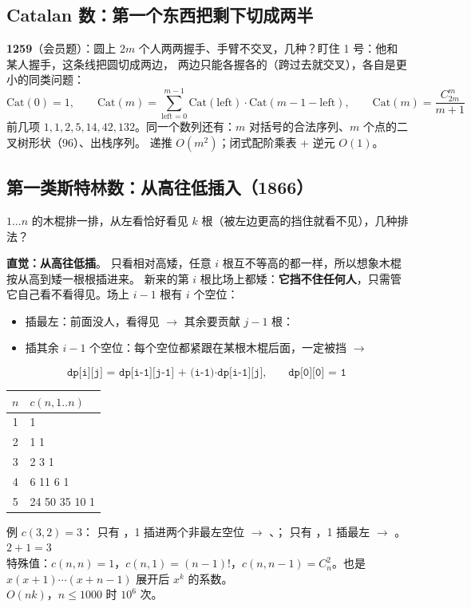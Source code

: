 \subsection{Catalan 数：第一个东西把剩下切成两半}

\textbf{1259}（会员题）：圆上 $2m$ 个人两两握手、手臂不交叉，几种？盯住 1 号：他和某人握手，这条线把圆切成两边，
两边只能各握各的（跨过去就交叉），各自是更小的同类问题：
\[
\text{Cat}(0) = 1,\qquad \text{Cat}(m) = \sum_{\text{left}=0}^{m-1} \text{Cat}(\text{left}) \cdot \text{Cat}(m-1-\text{left}),\qquad \text{Cat}(m) = \frac{C_{2m}^{m}}{m+1}
\]
前几项 $1, 1, 2, 5, 14, 42, 132$。同一个数列还有：$m$ 对括号的合法序列、$m$ 个点的二叉树形状（96）、出栈序列。
递推 $O(m^2)$；闭式配阶乘表 + 逆元 $O(1)$。

\subsection{第一类斯特林数：从高往低插入（1866）}

$1 \dots n$ 的木棍排一排，从左看恰好看见 $k$ 根（被左边更高的挡住就看不见），几种排法？

\textbf{直觉：从高往低插}。 只看相对高矮，任意 $i$ 根互不等高的都一样，所以想象木棍按从高到矮一根根插进来。
新来的第 $i$ 根比场上都矮：\textbf{它挡不住任何人}，只需管它自己看不看得见。场上 $i-1$ 根有 $i$ 个空位：
\begin{itemize}
\item 插最左：前面没人，看得见 $\to$ 其余要贡献 $j-1$ 根：
\item 插其余 $i-1$ 个空位：每个空位都紧跟在某根木棍后面，一定被挡 $\to$ 
\end{itemize}
\[
\texttt{dp[i][j] = dp[i-1][j-1] + (i-1)·dp[i-1][j]},\qquad \texttt{dp[0][0] = 1}
\]

\begin{center}\small
\begin{tabular}{@{}c l@{}}
\toprule
$n$ & $c(n, 1..n)$\\
\midrule
1 & 1\\
2 & 1 1\\
3 & 2 3 1\\
4 & 6 11 6 1\\
5 & 24 50 35 10 1\\
\bottomrule
\end{tabular}
\qquad
\begin{minipage}{0.55\linewidth}\small
例 $c(3,2) = 3$： 只有 ，1 插进两个非最左空位 $\to$ 、；
 只有 ，1 插最左 $\to$ 。$2 + 1 = 3$ \checkmark\\[3pt]
特殊值：$c(n,n) = 1$，$c(n,1) = (n-1)!$，$c(n,n-1) = C_n^2$。也是 $x(x+1)\cdots(x+n-1)$ 展开后 $x^k$ 的系数。\\[3pt]
$O(nk)$，$n \le 1000$ 时 $10^6$ 次。
\end{minipage}
\end{center}

